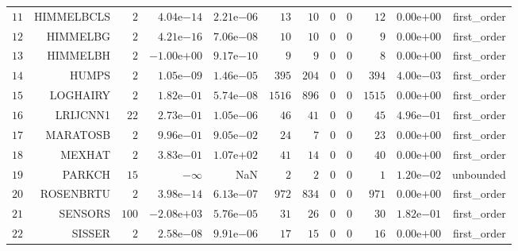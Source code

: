 \begin{longtable}{rrrrrrrrrrrr}
  \(    11\) & HIMMELBCLS & \(     2\) & \( 4.04\)e\(-14\) & \( 2.21\)e\(-06\) & \(    13\) & \(    10\) & \(     0\) & \(     0\) & \(    12\) & \( 0.00\)e\(+00\) & first\_order \\
  \(    12\) & HIMMELBG & \(     2\) & \( 4.21\)e\(-16\) & \( 7.06\)e\(-08\) & \(    10\) & \(    10\) & \(     0\) & \(     0\) & \(     9\) & \( 0.00\)e\(+00\) & first\_order \\
  \(    13\) & HIMMELBH & \(     2\) & \(-1.00\)e\(+00\) & \( 9.17\)e\(-10\) & \(     9\) & \(     9\) & \(     0\) & \(     0\) & \(     8\) & \( 0.00\)e\(+00\) & first\_order \\
  \(    14\) & HUMPS & \(     2\) & \( 1.05\)e\(-09\) & \( 1.46\)e\(-05\) & \(   395\) & \(   204\) & \(     0\) & \(     0\) & \(   394\) & \( 4.00\)e\(-03\) & first\_order \\
  \(    15\) & LOGHAIRY & \(     2\) & \( 1.82\)e\(-01\) & \( 5.74\)e\(-08\) & \(  1516\) & \(   896\) & \(     0\) & \(     0\) & \(  1515\) & \( 0.00\)e\(+00\) & first\_order \\
  \(    16\) & LRIJCNN1 & \(    22\) & \( 2.73\)e\(-01\) & \( 1.05\)e\(-06\) & \(    46\) & \(    41\) & \(     0\) & \(     0\) & \(    45\) & \( 4.96\)e\(-01\) & first\_order \\
  \(    17\) & MARATOSB & \(     2\) & \( 9.96\)e\(-01\) & \( 9.05\)e\(-02\) & \(    24\) & \(     7\) & \(     0\) & \(     0\) & \(    23\) & \( 0.00\)e\(+00\) & first\_order \\
  \(    18\) & MEXHAT & \(     2\) & \( 3.83\)e\(-01\) & \( 1.07\)e\(+02\) & \(    41\) & \(    14\) & \(     0\) & \(     0\) & \(    40\) & \( 0.00\)e\(+00\) & first\_order \\
  \(    19\) & PARKCH & \(    15\) & \(-\infty\) &       NaN & \(     2\) & \(     2\) & \(     0\) & \(     0\) & \(     1\) & \( 1.20\)e\(-02\) & unbounded \\
  \(    20\) & ROSENBRTU & \(     2\) & \( 3.98\)e\(-14\) & \( 6.13\)e\(-07\) & \(   972\) & \(   834\) & \(     0\) & \(     0\) & \(   971\) & \( 0.00\)e\(+00\) & first\_order \\
  \(    21\) & SENSORS & \(   100\) & \(-2.08\)e\(+03\) & \( 5.76\)e\(-05\) & \(    31\) & \(    26\) & \(     0\) & \(     0\) & \(    30\) & \( 1.82\)e\(-01\) & first\_order \\
  \(    22\) & SISSER & \(     2\) & \( 2.58\)e\(-08\) & \( 9.91\)e\(-06\) & \(    17\) & \(    15\) & \(     0\) & \(     0\) & \(    16\) & \( 0.00\)e\(+00\) & first\_order \\

\end{longtable}
